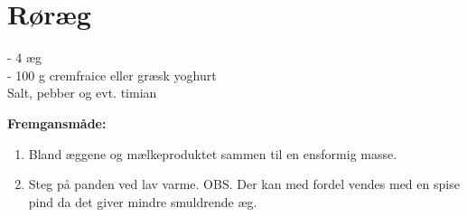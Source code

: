 \documentclass{book}
\begin{document}
\clearpage \section{Røræg}
\begin{minipage}[t]{0.5\textwidth}
 - 4 æg
\\ - 100 g cremfraice eller græsk yoghurt
\\ Salt, pebber og evt. timian
\end{minipage}
\begin{minipage}[t]{0.5\textwidth}
 \textbf{Fremgansmåde:}
\begin{enumerate}
    \item Bland æggene og mælkeproduktet sammen til en ensformig masse. 
    \item Steg på panden ved lav varme.
    OBS. Der kan med fordel vendes med en spise pind da det giver mindre smuldrende æg.
\end{enumerate}
\end{minipage}
\end{document}
